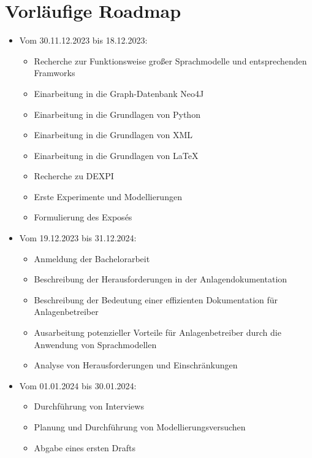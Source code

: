 \section{Vorläufige Roadmap}
\label{sec:roadmap}

\begin{itemize}
    \item Vom 30.11.12.2023 bis 18.12.2023:
    \begin{itemize}
        \item Recherche zur Funktionsweise großer Sprachmodelle und entsprechenden Framworks
        \item Einarbeitung in die Graph-Datenbank Neo4J
        \item Einarbeitung in die Grundlagen von Python
        \item Einarbeitung in die Grundlagen von XML
        \item Einarbeitung in die Grundlagen von LaTeX
        \item Recherche zu DEXPI
        \item Erste Experimente und Modellierungen
        \item Formulierung des Exposés
    \end{itemize}
    
    \item Vom 19.12.2023 bis 31.12.2024:
    \begin{itemize}
        \item Anmeldung der Bachelorarbeit
        \item Beschreibung der Herausforderungen in der Anlagendokumentation
        \item Beschreibung der Bedeutung einer effizienten Dokumentation für Anlagenbetreiber
        \item Ausarbeitung potenzieller Vorteile für Anlagenbetreiber durch die Anwendung von Sprachmodellen
        \item Analyse von Herausforderungen und Einschränkungen
    \end{itemize}
    
    \item Vom 01.01.2024 bis 30.01.2024:
    \begin{itemize}
        \item Durchführung von Interviews
        \item Planung und Durchführung von Modellierungsversuchen
        \item Abgabe eines ersten Drafts
    \end{itemize}
    

\end{itemize}
